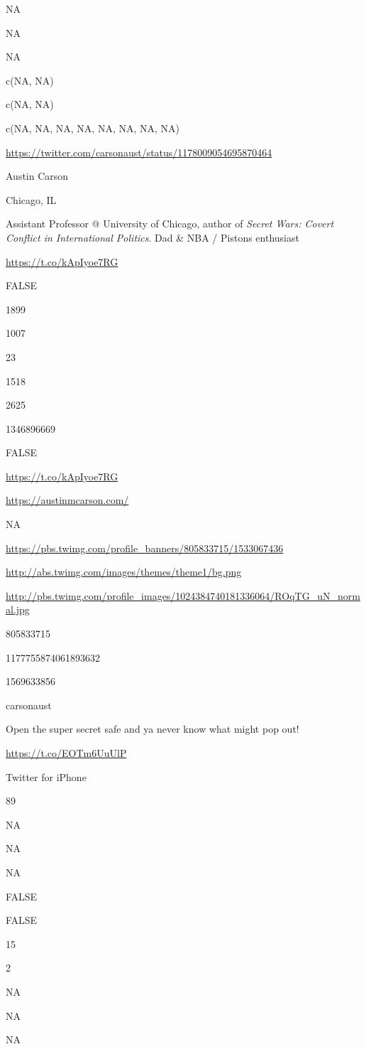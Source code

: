 \documentclass[]{book}
\begin{document}
NA

NA

NA

c(NA, NA)

c(NA, NA)

c(NA, NA, NA, NA, NA, NA, NA, NA)

\url{https://twitter.com/carsonaust/status/1178009054695870464}

Austin Carson

Chicago, IL

Assistant Professor @ University of Chicago, author of \emph{Secret
Wars: Covert Conflict in International Politics}. Dad \& NBA / Pistons
enthusiast

\url{https://t.co/kApIyoe7RG}

FALSE

1899

1007

23

1518

2625

1346896669

FALSE

\url{https://t.co/kApIyoe7RG}

\url{https://austinmcarson.com/}

NA

\url{https://pbs.twimg.com/profile_banners/805833715/1533067436}

\url{http://abs.twimg.com/images/themes/theme1/bg.png}

\url{http://pbs.twimg.com/profile_images/1024384740181336064/ROqTG_uN_normal.jpg}

805833715

1177755874061893632

1569633856

carsonaust

Open the super secret safe and ya never know what might pop out!

\url{https://t.co/EOTm6UuUlP}

Twitter for iPhone

89

NA

NA

NA

FALSE

FALSE

15

2

NA

NA

NA
\end{document}
